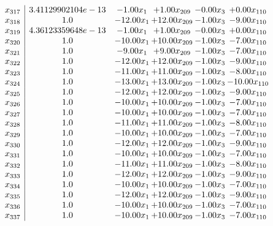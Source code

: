 \documentclass[8pt]{article}
\begin{document}
\[\begin{array}{c| c c@{\hskip 2pt} c@{\hskip 2pt} c@{\hskip 2pt} c@{\hskip 2pt} }
 x_{317}   &  3.41129902104e-13 & -1.00 x_{1} & +  1.00 x_{209} & -0.00 x_{3} & +  0.00 x_{110}\\
 x_{318}   &  1.0 & -12.00 x_{1} & + 12.00 x_{209} & -1.00 x_{3} & -9.00 x_{110}\\
 x_{319}   &  4.36123359648e-13 & -1.00 x_{1} & +  1.00 x_{209} & -0.00 x_{3} & +  0.00 x_{110}\\
 x_{320}   &  1.0 & -10.00 x_{1} & + 10.00 x_{209} & -1.00 x_{3} & -7.00 x_{110}\\
 x_{321}   &  1.0 & -9.00 x_{1} & +  9.00 x_{209} & -1.00 x_{3} & -7.00 x_{110}\\
 x_{322}   &  1.0 & -12.00 x_{1} & + 12.00 x_{209} & -1.00 x_{3} & -9.00 x_{110}\\
 x_{323}   &  1.0 & -11.00 x_{1} & + 11.00 x_{209} & -1.00 x_{3} & -8.00 x_{110}\\
 x_{324}   &  1.0 & -13.00 x_{1} & + 13.00 x_{209} & -1.00 x_{3} & -10.00 x_{110}\\
 x_{325}   &  1.0 & -12.00 x_{1} & + 12.00 x_{209} & -1.00 x_{3} & -9.00 x_{110}\\
 x_{326}   &  1.0 & -10.00 x_{1} & + 10.00 x_{209} & -1.00 x_{3} & -7.00 x_{110}\\
 x_{327}   &  1.0 & -10.00 x_{1} & + 10.00 x_{209} & -1.00 x_{3} & -7.00 x_{110}\\
 x_{328}   &  1.0 & -11.00 x_{1} & + 11.00 x_{209} & -1.00 x_{3} & -8.00 x_{110}\\
 x_{329}   &  1.0 & -10.00 x_{1} & + 10.00 x_{209} & -1.00 x_{3} & -7.00 x_{110}\\
 x_{330}   &  1.0 & -12.00 x_{1} & + 12.00 x_{209} & -1.00 x_{3} & -9.00 x_{110}\\
 x_{331}   &  1.0 & -10.00 x_{1} & + 10.00 x_{209} & -1.00 x_{3} & -7.00 x_{110}\\
 x_{332}   &  1.0 & -11.00 x_{1} & + 11.00 x_{209} & -1.00 x_{3} & -8.00 x_{110}\\
 x_{333}   &  1.0 & -12.00 x_{1} & + 12.00 x_{209} & -1.00 x_{3} & -9.00 x_{110}\\
 x_{334}   &  1.0 & -10.00 x_{1} & + 10.00 x_{209} & -1.00 x_{3} & -7.00 x_{110}\\
 x_{335}   &  1.0 & -12.00 x_{1} & + 12.00 x_{209} & -1.00 x_{3} & -9.00 x_{110}\\
 x_{336}   &  1.0 & -10.00 x_{1} & + 10.00 x_{209} & -1.00 x_{3} & -7.00 x_{110}\\
 x_{337}   &  1.0 & -10.00 x_{1} & + 10.00 x_{209} & -1.00 x_{3} & -7.00 x_{110}\\

\end{array}\]
\end{document}
